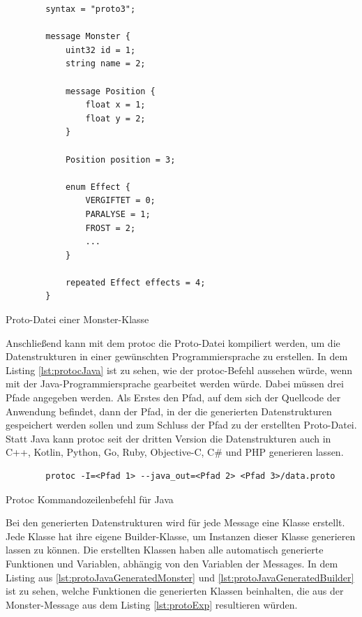 \begin{listing}[htp]
    \begin{verbatim} 
        syntax = "proto3";
        
        message Monster {
            uint32 id = 1;
            string name = 2;

            message Position {
                float x = 1;
                float y = 2;
            }

            Position position = 3;

            enum Effect {
                VERGIFTET = 0;
                PARALYSE = 1;
                FROST = 2;
                ...
            }

            repeated Effect effects = 4;
        }
    \end{verbatim}
    \caption{Proto-Datei einer Monster-Klasse}
    \label{lst:protoExp}
\end{listing}

Anschließend kann mit dem \ac{protoc} die Proto-Datei kompiliert werden, um die Datenstrukturen in einer gewünschten Programmiersprache zu erstellen. In dem Listing \ref{lst:protocJava} ist zu sehen, wie der \ac{protoc}-Befehl aussehen würde, wenn mit der Java-Programmiersprache gearbeitet werden würde. Dabei müssen drei Pfade angegeben werden. Als Erstes den Pfad, auf dem sich der Quellcode der Anwendung befindet, dann der Pfad, in der die generierten Datenstrukturen gespeichert werden sollen und zum Schluss der Pfad zu der erstellten Proto-Datei. Statt Java kann \ac{protoc} seit der dritten Version die Datenstrukturen auch in C++, Kotlin, Python, Go, Ruby, Objective-C, C\# und PHP generieren lassen.\cite{protobufLanguageGuide}\cite{protobufProtocolBufferJava}

\begin{listing}[htp]
    \begin{verbatim} 
        protoc -I=<Pfad 1> --java_out=<Pfad 2> <Pfad 3>/data.proto
    \end{verbatim}
    \caption{Protoc Kommandozeilenbefehl für Java\cite{protobufProtocolBufferJava}}
    \label{lst:protocJava}
\end{listing}

Bei den generierten Datenstrukturen wird für jede Message eine Klasse erstellt. Jede Klasse hat ihre eigene Builder-Klasse, um Instanzen dieser Klasse generieren lassen zu können. Die erstellten Klassen haben alle automatisch generierte Funktionen und Variablen, abhängig von den Variablen der Messages. In dem Listing aus \ref{lst:protoJavaGeneratedMonster} und \ref{lst:protoJavaGeneratedBuilder} ist zu sehen, welche Funktionen die generierten Klassen beinhalten, die aus der Monster-Message aus dem Listing \ref{lst:protoExp} resultieren würden. 

